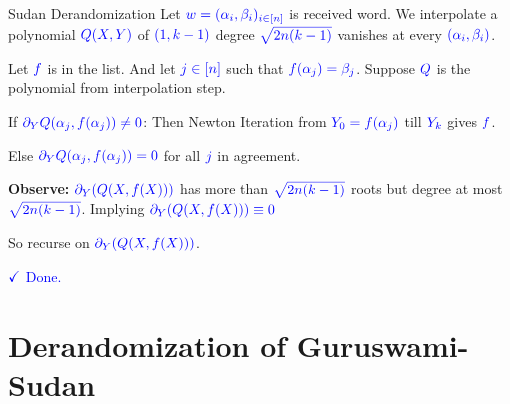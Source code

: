 \documentclass[10pt,handout]{beamer}
\begin{document}
\begin{frame}{Sudan Derandomization}
	Let $\textcolor{blue}{w=(\alpha_i,\beta_i)_{i\in[n]}}$ is received word. We interpolate a polynomial $\textcolor{blue}{Q(X,Y)}$ of $\textcolor{blue}{(1,k-1)}$ degree $\textcolor{blue}{\sqrt{2n(k-1)}}$ vanishes at every $\textcolor{blue}{(\alpha_i,\beta_i)}$.\pause \vspace*{0.5em}

	Let $\textcolor{blue}{\textcolor{blue}{f}}$ is in the list. And let $\textcolor{blue}{\textcolor{blue}{j\in[n]}}$ such that $\textcolor{blue}{\textcolor{blue}{f(\alpha_j)=\beta_j}}$. Suppose $\textcolor{blue}{\textcolor{blue}{Q}}$ is the polynomial from interpolation step.\pause
	\vfill

	If $\textcolor{blue}{\textcolor{blue}{\partial_Y Q(\alpha_j,f(\alpha_j))\neq 0}}$:
	Then Newton Iteration from $\textcolor{blue}{\textcolor{blue}{Y_0=f(\alpha_j)}}$ till $\textcolor{blue}{\textcolor{blue}{Y_k}}$ gives $\textcolor{blue}{\textcolor{blue}{f}}$. \pause\vfill

	Else $\textcolor{blue}{\textcolor{blue}{\partial_Y Q(\alpha_j,f(\alpha_j))=0}}$ for all $\textcolor{blue}{\textcolor{blue}{j}}$ in agreement.\pause \vfill

	\textbf{Observe:} $\textcolor{blue}{\textcolor{blue}{\partial_Y(Q(X,f(X)))}}$ has more than $\textcolor{blue}{\textcolor{blue}{\sqrt{2n(k-1)}}}$ roots but degree at most $\textcolor{blue}{\textcolor{blue}{\sqrt{2n(k-1)}}}$.
	Implying $\textcolor{blue}{\textcolor{blue}{\partial_Y(Q(X,f(X)))\equiv 0}}$\pause

	So recurse on $\textcolor{blue}{\textcolor{blue}{\partial_Y(Q(X,f(X)))}}$.\pause

	\vfill
	
	\hfill\textcolor{blue}{$\textcolor{blue}{\checkmark}$ Done.}
\end{frame}

\section{Derandomization of Guruswami-Sudan}
\end{document}
